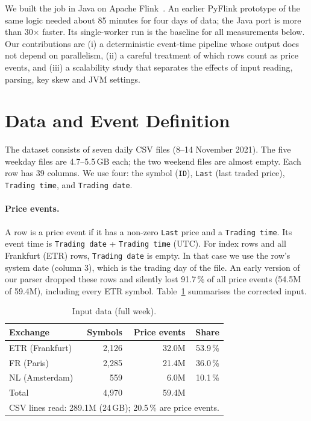 \documentclass[sigconf,nonacm]{acmart}
\begin{document}
We built the job in Java on Apache Flink~\cite{flink}. An earlier PyFlink
prototype of the same logic needed about 85 minutes for four days of data;
the Java port is more than 30$\times$ faster. Its single-worker run is the
baseline for all measurements below. Our contributions are (i) a deterministic
event-time pipeline whose output does not depend on parallelism, (ii) a careful
treatment of which rows count as price events, and (iii) a scalability study
that separates the effects of input reading, parsing, key skew and JVM
settings.

\section{Data and Event Definition}\label{sec:data}
The dataset consists of seven daily CSV files (8--14 November 2021). The five
weekday files are 4.7--5.5\,GB each; the two weekend files are almost empty.
Each row has 39 columns. We use four: the symbol (\texttt{ID}), \texttt{Last}
(last traded price), \texttt{Trading time}, and \texttt{Trading date}.

\paragraph{Price events.} A row is a price event if it has a non-zero
\texttt{Last} price and a \texttt{Trading time}. Its event time is
\texttt{Trading date} + \texttt{Trading time} (UTC). For index rows and all
Frankfurt (ETR) rows, \texttt{Trading date} is empty. In that case we use the
row's system date (column 3), which is the trading day of the file. An early
version of our parser dropped these rows and silently lost 91.7\,\% of all
price events (54.5M of 59.4M), including every ETR symbol. Table~\ref{tab:data} summarises the
corrected input.

\begin{table}[t]
\caption{Input data (full week).}\label{tab:data}
\begin{tabular}{lrrr}
\toprule
Exchange & Symbols & Price events & Share \\
\midrule
ETR (Frankfurt) & 2,126 & 32.0M & 53.9\,\% \\
FR (Paris)      & 2,285 & 21.4M & 36.0\,\% \\
NL (Amsterdam)  &   559 &  6.0M & 10.1\,\% \\
\midrule
Total & 4,970 & 59.4M & \\
\multicolumn{4}{l}{\footnotesize CSV lines read: 289.1M (24\,GB); 20.5\,\% are price events.}\\
\bottomrule
\end{tabular}
\end{table}
\end{document}
